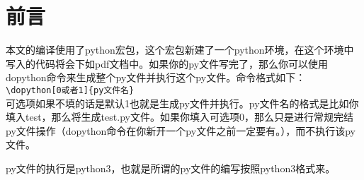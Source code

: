 \documentclass[11pt,oneside]{book}
\begin{document}
\frontmatter

\author{万泽}
\titleLA

\chapter*{前言}
\begin{common-format}
本文的编译使用了python宏包，这个宏包新建了一个python环境，在这个环境中写入的代码将会下如pdf文档中。如果你的py文件写完了，那么你可以使用dopython命令来生成整个py文件并执行这个py文件。命令格式如下：\\
\verb+\dopython[0或者1]{py文件名}+\\
可选项如果不填的话是默认1也就是生成py文件并执行。py文件名的格式是比如你填入test，那么将生成test.py文件。如果你填入可选项0，那么只是进行常规完结py文件操作（dopython命令在你新开一个py文件之前一定要有。），而不执行该py文件。

py文件的执行是python3，也就是所谓的py文件的编写按照python3格式来。


\end{common-format}


\setcounter{tocdepth}{2}
\tableofcontents
\end{document}
